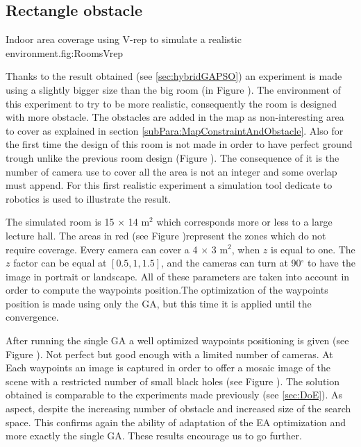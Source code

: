 	\subsection{Rectangle obstacle } \label{sec:expRectObstacle}
	\begin{mfigures}[!]{Indoor area coverage using V-rep to simulate a realistic environment.}{fig:RoomsVrep} \centering
{}
\hspace{1cm}
\hspace{1cm}

\tabsimuposeVrep
\end{mfigures}
	
	Thanks to the result obtained (see \ref{sec:hybridGAPSO}) an experiment is made using a slightly bigger size than the big room (in Figure ). The environment of this experiment to try to be more realistic, consequently the room is designed with more obstacle. 
	The obstacles are added in the map as non-interesting area to cover as explained in  section \ref{subPara:MapConstraintAndObstacle}. Also for the first time the design of this room  is  not made in order to have perfect ground trough unlike the previous room design (Figure ). The consequence of it is the number of camera use to cover all the area is not an integer and some overlap must append.
	For this first realistic experiment a simulation tool dedicate to robotics is used to illustrate the result. 
	     
	The simulated room is 15 $\times$ 14 m$^2$ which corresponds more or less to a large lecture hall. The areas in red (see Figure )represent the zones which do not require coverage. Every camera can cover a 4 $\times$ 3 m$^2$,  when $z$ is equal to one. The $z$ factor can be equal at $[0.5, 1, 1.5]$, and the cameras can turn  at 90$^{\circ}$ to have the image in portrait or landscape. All of these parameters are taken into account in order to compute the waypoints position.The optimization of the waypoints position is made using  only the GA, but this time it is applied until the convergence. 
	
	 After running the single GA  a well optimized waypoints positioning is given (see Figure ). Not perfect but good enough with a limited number of cameras. At Each waypoints an image is captured in order to offer a  mosaic image of the scene with a restricted number of small black holes (see Figure ).
	  The solution obtained is comparable to the experiments made previously (see \ref{sec:DoE}). As aspect, despite the increasing number of obstacle and increased size of the search space. This confirms again the ability of adaptation of the EA optimization and more exactly the single GA. These results encourage us to go  further. 

